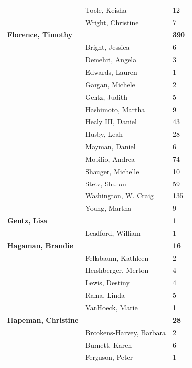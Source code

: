 \documentclass{article}\usepackage[]{graphicx}\usepackage[]{color}
\begin{document}
{\begin{longtable} { >{\raggedright}p{}|p{}p{}}
   \rowcolor[gray]{0.90} & Toole, Keisha & 12 \\ 
   \rowcolor[gray]{0.90} & Wright, Christine & 7 \\ 
   \rowcolor[gray]{0.90}\textbf{Florence, Timothy} &  & \hspace{2cm}\textbf{390} \\ 
   & Bright, Jessica & 6 \\ 
   & Demehri, Angela & 3 \\ 
   & Edwards, Lauren & 1 \\ 
   \rowcolor[gray]{0.90} & Gargan, Michele & 2 \\ 
   \rowcolor[gray]{0.90} & Gentz, Judith & 5 \\ 
   \rowcolor[gray]{0.90} & Hashimoto, Martha & 9 \\ 
   & Healy III, Daniel & 43 \\ 
   & Husby, Leah & 28 \\ 
   & Mayman, Daniel & 6 \\ 
   \rowcolor[gray]{0.90} & Mobilio, Andrea & 74 \\ 
   \rowcolor[gray]{0.90} & Shauger, Michelle & 10 \\ 
   \rowcolor[gray]{0.90} & Stetz, Sharon & 59 \\ 
   & Washington, W. Craig & 135 \\ 
   & Young, Martha & 9 \\ 
  \textbf{Gentz, Lisa} &  & \hspace{2cm}\textbf{1} \\ 
   \rowcolor[gray]{0.90} & Leadford, William & 1 \\ 
   \rowcolor[gray]{0.90}\textbf{Hagaman, Brandie} &  & \hspace{2cm}\textbf{16} \\ 
   \rowcolor[gray]{0.90} & Fellabaum, Kathleen & 2 \\ 
   & Hershberger, Merton & 4 \\ 
   & Lewis, Destiny & 4 \\ 
   & Rama, Linda & 5 \\ 
   \rowcolor[gray]{0.90} & VanHoeck, Marie & 1 \\ 
   \rowcolor[gray]{0.90}\textbf{Hapeman, Christine} &  & \hspace{2cm}\textbf{28} \\ 
   \rowcolor[gray]{0.90} & Brookens-Harvey, Barbara & 2 \\ 
   & Burnett, Karen & 6 \\ 
   & Ferguson, Peter & 1 \\ 

\end{longtable}}
\end{document}
